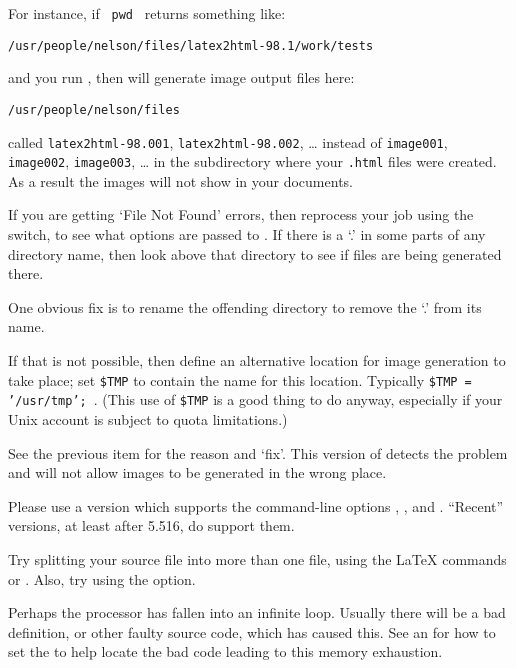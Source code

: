 \begin{htmllist}
For instance, if \texttt{ pwd } returns something like:
\begin{verbatim}
/usr/people/nelson/files/latex2html-98.1/work/tests
\end{verbatim}
and you run \latextohtml, then  will generate 
image output files here:
\begin{verbatim}
/usr/people/nelson/files
\end{verbatim}
  called \texttt{latex2html-98.001}, \texttt{latex2html-98.002}, \dots
  instead of \texttt{image001}, \texttt{image002}, \texttt{image003}, \dots
  in the subdirectory where your \texttt{.html} files were created.
  As a result the images will not show in your documents.

  If you are getting `File Not Found' errors,
  then reprocess your job using the  switch,
  to see what options are passed to .
  If there is a `.' in some parts of any directory name, 
  then look above that directory
  to see if files are being generated there.

\medskip

  One obvious fix is to rename the offending directory
  to remove the `.' from its name.

  If that is not possible, then define an alternative location
  for image generation to take place; set \texttt{\$TMP} to contain
  the name for this location. Typically \texttt{\$TMP = '/usr/tmp';}~.
  (This use of \texttt{\$TMP} is a good thing to do anyway,
  especially if your Unix account is subject to quota limitations.)

\item [It stops after having run \LaTeX, displaying a message about \fn{dvips}: ]
  See the previous item for the reason and `fix'. 
  This version of \latextohtml{} detects the problem 
  and will not allow images to be generated in the wrong place.

\item [\fn{dvips} complains about incorrect arguments:\label{dvips} ]
Please use a version which supports the command-line options , ,
 and . ``Recent'' versions, at least after 5.516, do support them.


\item [It gives an ``\texttt{Out of memory}'' message and dies: ] 
Try splitting your source file into more than one file,
using the \LaTeX{} commands  or . 
Also, try using the  option.

Perhaps the processor has fallen into an infinite loop.
Usually there will be a bad definition, or other faulty source code,
which has caused this. 
See an  for
how to set the   to 
help locate the bad code leading to this memory exhaustion.


\end{htmllist}
